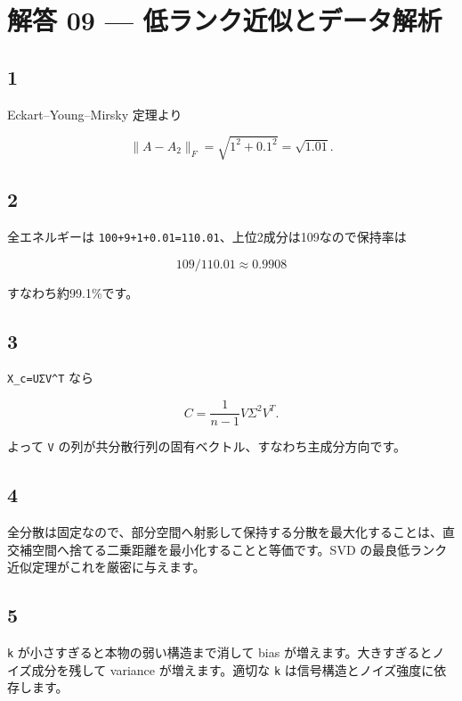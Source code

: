 \documentclass[
  11pt,
  a4paper,
]{ltjsarticle}
\author{}
\date{}
\begin{document}
\hypertarget{ux89e3ux7b54-09-ux4f4eux30e9ux30f3ux30afux8fd1ux4f3cux3068ux30c7ux30fcux30bfux89e3ux6790}{%
\section{解答 09 ---
低ランク近似とデータ解析}\label{ux89e3ux7b54-09-ux4f4eux30e9ux30f3ux30afux8fd1ux4f3cux3068ux30c7ux30fcux30bfux89e3ux6790}}

\hypertarget{section}{%
\subsection{1}\label{section}}

Eckart--Young--Mirsky 定理より

\[
\|A-A_2\|_F=\sqrt{1^2+0.1^2}=\sqrt{1.01}.
\]

\hypertarget{section-1}{%
\subsection{2}\label{section-1}}

全エネルギーは
\texttt{100+9+1+0.01=110.01}、上位2成分は109なので保持率は

\[
109/110.01\approx0.9908
\]

すなわち約99.1\%です。

\hypertarget{section-2}{%
\subsection{3}\label{section-2}}

\texttt{X\_c=UΣV\^{}T} なら

\[
C=\frac1{n-1}VΣ^2V^T.
\]

よって \texttt{V}
の列が共分散行列の固有ベクトル、すなわち主成分方向です。

\hypertarget{section-3}{%
\subsection{4}\label{section-3}}

全分散は固定なので、部分空間へ射影して保持する分散を最大化することは、直交補空間へ捨てる二乗距離を最小化することと等価です。SVD
の最良低ランク近似定理がこれを厳密に与えます。

\hypertarget{section-4}{%
\subsection{5}\label{section-4}}

\texttt{k} が小さすぎると本物の弱い構造まで消して bias
が増えます。大きすぎるとノイズ成分を残して variance が増えます。適切な
\texttt{k} は信号構造とノイズ強度に依存します。
\end{document}
